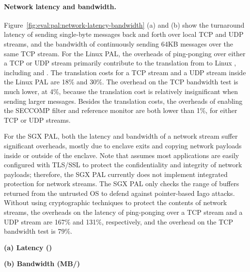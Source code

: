 




\paragraph{Network latency and bandwidth.}
Figure~\ref{fig:eval:pal:network-latency-bandwidth} (a) and (b) show the turnaround latency of sending single-byte messages back and forth over local TCP and UDP streams, and the bandwidth of continuously sending 64KB messages over the same TCP stream.
For the Linux PAL,
the overheads of ping-ponging over either a TCP or UDP stream primarily contribute to the translation from \hostapis{} to Linux \linuxapis{}, including  and .
The translation costs for a TCP stream and a UDP stream inside the Linux PAL are \roughly{}18\% and \roughly{}30\%.
The overhead on the TCP bandwidth test is much lower,
at \roughly{}4\%, because the translation cost is relatively insignificant when sending larger messages. 
Besides the translation costs, the overheads of enabling the SECCOMP filter and reference monitor are both lower than 1\%, for either TCP or UDP streams.


For the SGX PAL, both the latency and bandwidth of a network stream suffer significant overheads, mostly due to enclave exits and copying network payloads inside or outside of the enclave. Note that \graphenesgx{} assumes most applications are easily configured with TLS/SSL to protect the confidentiality and integrity of network payloads; therefore, the SGX PAL currently does not implement integrated protection for network streams. The SGX PAL only checks the range of buffers
returned from the untrusted OS
to defend against pointer-based Iago attacks.
Without using cryptographic techniques to protect the contents of network streams, the overheads on the latency of ping-ponging over a TCP stream and a UDP stream are \roughly{}167\% and \roughly{}131\%, respectively, and the overhead on the TCP bandwidth test is \roughly{}79\%. 

\begin{figure*}[t!]
\centering
\footnotesize
{}
\parbox{0.24\textwidth}{\quad}
\parbox{0.49\textwidth}{\centering\bf (a) Latency ({\usec})}
\parbox{0.24\textwidth}{\centering\bf (b) Bandwidth (MB/\asec{})}
\caption{(a) Latency of sending a short message over TCP and UDP sockets (lower is better), and (b) bandwidth of sending large data over TCP (higher is better).
The comparison is between (1)  and  on Linux; (2)  and  on a Linux PAL, with and without a SECCOMP filter ({\bf +SC}) and reference monitor ({\bf +RM}); (3) the same \hostapis{} on the SGX PAL, without data protection.}
\label{fig:eval:pal:network-latency-bandwidth}
\end{figure*}




